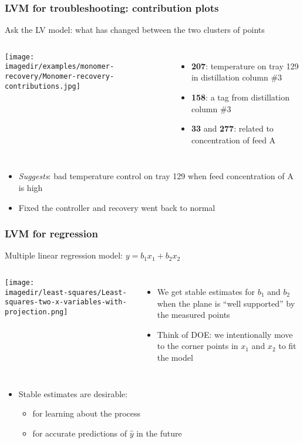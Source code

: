 \begin{frame}\frametitle{LVM for troubleshooting: contribution plots}

	Ask the LV model: what has changed between the two clusters of points
	\begin{columns}[c]
			\begin{center}
				\texttt{[image: \\imagedir/examples/monomer-recovery/Monomer-recovery-contributions.jpg]} 
			\end{center}
			\vfill
			\begin{itemize}
				\item	\textbf{207}: temperature on tray 129 in distillation column \#3
				\item	\textbf{158}: a tag from distillation column \#3
				\item	\textbf{33} and \textbf{277}: related to concentration of feed A
			\end{itemize}
	\end{columns}
	\begin{itemize}
		\item	\emph{Suggests}: bad temperature control on tray 129 when feed concentration of A is high
		\item	Fixed the controller and recovery went back to normal  
	\end{itemize}
\end{frame}

\begin{frame}\frametitle{LVM for regression}

	Multiple linear regression model: $y = b_1x_1 + b_2x_2$
	\begin{columns}
		\column{6cm}
		\texttt{[image: \\imagedir/least-squares/Least-squares-two-x-variables-with-projection.png]} \column{4cm}
		\begin{itemize}
			\item	We get stable estimates for $b_1$ and $b_2$ when the plane is ``well supported'' by the measured points
			\item	Think of DOE: we intentionally move to the corner points in $x_1$ and $x_2$ to fit the model
		\end{itemize}
	\end{columns}
	\begin{itemize}
		\item	Stable estimates are desirable:
		\begin{itemize}
			\item	for learning about the process
			\item	for accurate predictions of $\hat{y}$ in the future
		\end{itemize}
	\end{itemize}
\end{frame}

